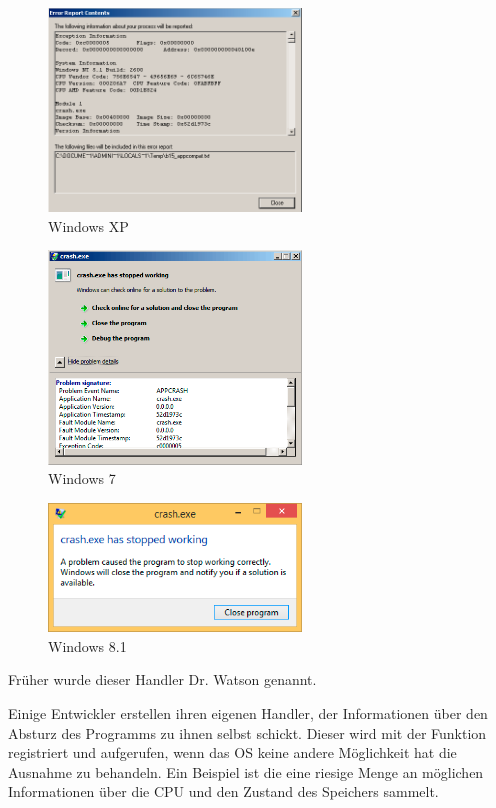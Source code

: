 \begin{figure}[H]
\centering
\includegraphics[width=0.6\textwidth]{OS/SEH/1/crash_xp2.png}
\caption{Windows XP}
\end{figure}

\begin{figure}[H]
\centering
\includegraphics[width=0.6\textwidth]{OS/SEH/1/crash_win7.png}
\caption{Windows 7}
\end{figure}

\begin{figure}[H]
\centering
\includegraphics[width=0.6\textwidth]{OS/SEH/1/crash_win81.png}
\caption{Windows 8.1}
\end{figure}

Früher wurde dieser Handler Dr. Watson
genannt.

Einige Entwickler erstellen ihren eigenen Handler, der Informationen über den Absturz
des Programms zu ihnen selbst schickt.
Dieser wird mit der Funktion  registriert und aufgerufen,
wenn das \ac{OS} keine andere Möglichkeit hat die Ausnahme zu behandeln.
\myindex{\oracle}
Ein Beispiel ist \oracle die eine riesige Menge an möglichen Informationen über die \ac{CPU}
und den Zustand des Speichers sammelt.

